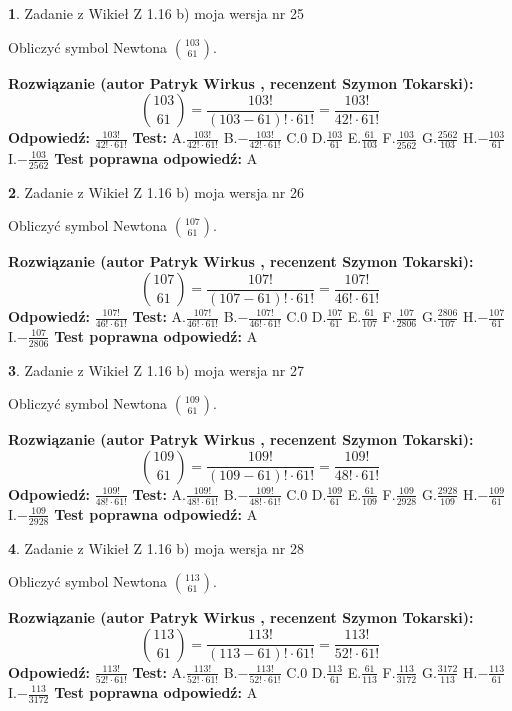 \documentclass[12pt, a4paper]{article}
\theoremstyle{definition} %
\newtheorem{zad}{}
\newcommand{\zadStart}[1]{\begin{zad}#1\newline}
\newcommand{\zadStop}{\end{zad}}
\newcommand{\rozwStart}[2]{\noindent \textbf{Rozwiązanie (autor #1 , recenzent #2): }\newline}
\newcommand{\rozwStop}{\newline}
\newcommand{\odpStart}{\noindent \textbf{Odpowiedź:}\newline}
\newcommand{\odpStop}{\newline}
\newcommand{\testStart}{\noindent \textbf{Test:}\newline}
\newcommand{\testStop}{\newline}
\newcommand{\kluczStart}{\noindent \textbf{Test poprawna odpowiedź:}\newline}
\newcommand{\kluczStop}{\newline}
\begin{document}
\zadStart{Zadanie z Wikieł Z 1.16 b) moja wersja nr 25}

Obliczyć symbol Newtona ${103 \choose 61}$.
\zadStop
\rozwStart{Patryk Wirkus}{Szymon Tokarski}
$${103 \choose 61} = \frac{103!}{(103-61)! \cdot 61!} = \frac{103!}{42! \cdot 61!}$$
\rozwStop
\odpStart
$\frac{103!}{42! \cdot 61!}$
\odpStop
\testStart
A.$\frac{103!}{42! \cdot 61!}$ B.$-\frac{103!}{42! \cdot 61!}$ C.$0$ D.$\frac{103}{61}$ E.$\frac{61}{103}$
F.$\frac{103}{2562}$ G.$\frac{2562}{103}$
H.$-\frac{103}{61}$
I.$-\frac{103}{2562}$
\testStop
\kluczStart
A
\kluczStop



\zadStart{Zadanie z Wikieł Z 1.16 b) moja wersja nr 26}

Obliczyć symbol Newtona ${107 \choose 61}$.
\zadStop
\rozwStart{Patryk Wirkus}{Szymon Tokarski}
$${107 \choose 61} = \frac{107!}{(107-61)! \cdot 61!} = \frac{107!}{46! \cdot 61!}$$
\rozwStop
\odpStart
$\frac{107!}{46! \cdot 61!}$
\odpStop
\testStart
A.$\frac{107!}{46! \cdot 61!}$ B.$-\frac{107!}{46! \cdot 61!}$ C.$0$ D.$\frac{107}{61}$ E.$\frac{61}{107}$
F.$\frac{107}{2806}$ G.$\frac{2806}{107}$
H.$-\frac{107}{61}$
I.$-\frac{107}{2806}$
\testStop
\kluczStart
A
\kluczStop



\zadStart{Zadanie z Wikieł Z 1.16 b) moja wersja nr 27}

Obliczyć symbol Newtona ${109 \choose 61}$.
\zadStop
\rozwStart{Patryk Wirkus}{Szymon Tokarski}
$${109 \choose 61} = \frac{109!}{(109-61)! \cdot 61!} = \frac{109!}{48! \cdot 61!}$$
\rozwStop
\odpStart
$\frac{109!}{48! \cdot 61!}$
\odpStop
\testStart
A.$\frac{109!}{48! \cdot 61!}$ B.$-\frac{109!}{48! \cdot 61!}$ C.$0$ D.$\frac{109}{61}$ E.$\frac{61}{109}$
F.$\frac{109}{2928}$ G.$\frac{2928}{109}$
H.$-\frac{109}{61}$
I.$-\frac{109}{2928}$
\testStop
\kluczStart
A
\kluczStop



\zadStart{Zadanie z Wikieł Z 1.16 b) moja wersja nr 28}

Obliczyć symbol Newtona ${113 \choose 61}$.
\zadStop
\rozwStart{Patryk Wirkus}{Szymon Tokarski}
$${113 \choose 61} = \frac{113!}{(113-61)! \cdot 61!} = \frac{113!}{52! \cdot 61!}$$
\rozwStop
\odpStart
$\frac{113!}{52! \cdot 61!}$
\odpStop
\testStart
A.$\frac{113!}{52! \cdot 61!}$ B.$-\frac{113!}{52! \cdot 61!}$ C.$0$ D.$\frac{113}{61}$ E.$\frac{61}{113}$
F.$\frac{113}{3172}$ G.$\frac{3172}{113}$
H.$-\frac{113}{61}$
I.$-\frac{113}{3172}$
\testStop
\kluczStart
A
\kluczStop
\end{document}
